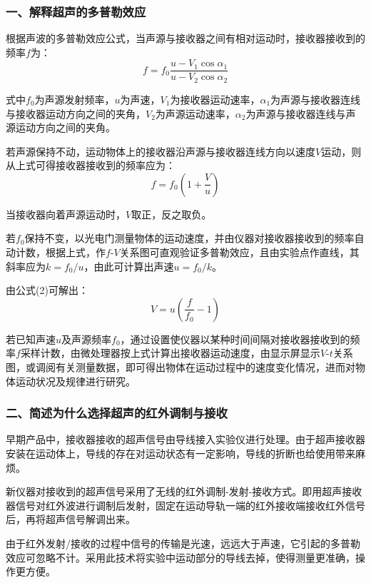 \documentclass[dvipsnames, svgnames,a4paper,11pt]{article}
\begin{document}
\subsubsection{一、解释超声的多普勒效应}

根据声波的多普勒效应公式，当声源与接收器之间有相对运动时，接收器接收到的频率$f$为：
\begin{equation}
	f = f_0 \frac{u - V_1\cos\alpha_1}{u - V_2\cos\alpha_2}
\end{equation}

式中$f_0$为声源发射频率，$u$为声速，$V_1$为接收器运动速率，$\alpha_1$为声源与接收器连线与接收器运动方向之间的夹角，$V_2$为声源运动速率，$\alpha_2$为声源与接收器连线与声源运动方向之间的夹角。

若声源保持不动，运动物体上的接收器沿声源与接收器连线方向以速度$V$运动，则从上式可得接收器接收到的频率应为：
\begin{equation}
	f = f_0\left(1 + \frac{V}{u}\right)
\end{equation}

当接收器向着声源运动时，$V$取正，反之取负。

若$f_0$保持不变，以光电门测量物体的运动速度，并由仪器对接收器接收到的频率自动计数，根据上式，作$f$-$V$关系图可直观验证多普勒效应，且由实验点作直线，其斜率应为$k=f_0/u$，由此可计算出声速$u=f_0/k$。

由公式(2)可解出：
\begin{equation}
	V = u\left(\frac{f}{f_0} - 1\right)
\end{equation}

若已知声速$u$及声源频率$f_0$，通过设置使仪器以某种时间间隔对接收器接收到的频率$f$采样计数，由微处理器按上式计算出接收器运动速度，由显示屏显示$V$-$t$关系图，或调阅有关测量数据，即可得出物体在运动过程中的速度变化情况，进而对物体运动状况及规律进行研究。

\subsubsection{二、简述为什么选择超声的红外调制与接收}

早期产品中，接收器接收的超声信号由导线接入实验仪进行处理。由于超声接收器安装在运动体上，导线的存在对运动状态有一定影响，导线的折断也给使用带来麻烦。

新仪器对接收到的超声信号采用了无线的红外调制-发射-接收方式。即用超声接收器信号对红外波进行调制后发射，固定在运动导轨一端的红外接收端接收红外信号后，再将超声信号解调出来。

由于红外发射/接收的过程中信号的传输是光速，远远大于声速，它引起的多普勒效应可忽略不计。采用此技术将实验中运动部分的导线去掉，使得测量更准确，操作更方便。
\end{document}
